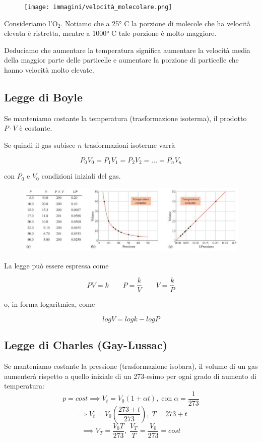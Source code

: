 \hspace{0.5cm}\begin{minipage}{0.55 \textwidth}
    \begin{figure}[H]
        \texttt{[image: immagini/velocità\_molecolare.png]}
    \end{figure}
\end{minipage}
\begin{minipage}{0.4 \textwidth}
\vspace{0.6cm}Consideriamo l'O$_2$. Notiamo che a 25° C la porzione di molecole che ha velocità elevata è ristretta, mentre a 1000° C tale porzione è molto maggiore.

Deduciamo che aumentare la temperatura significa aumentare la velocità media della maggior parte delle particelle e aumentare la porzione di particelle che hanno velocità molto elevate.
\end{minipage}

\subsection{Legge di Boyle}
Se manteniamo costante la temperatura (trasformazione isoterma), il prodotto $P \cdot V$ è costante.

Se quindi il gas subisce $n$ trasformazioni isoterme varrà

$$P_0V_0=P_1V_1=P_2V_2=...=P_nV_n$$

con $P_0$ e $V_0$ condizioni iniziali del gas.

\begin{figure}[htp]
    \centering
    \includegraphics[width=15cm]{immagini/Legge_di_Boyle.png}
\end{figure}

La legge può essere espressa come

$$PV=k \qquad P=\frac{k}{V} \qquad V=\frac{k}{P}$$

o, in forma logaritmica, come

$$logV = logk - log P$$
\newpage
\subsection{Legge di Charles (Gay-Lussac)}
Se manteniamo costante la pressione (trasformazione isobara), il volume di un gas aumenterà rispetto a quello iniziale di un 273-esimo per ogni grado di aumento di temperatura:
$$p=cost \implies V_t=V_0(1 + \alpha t), \; \text{con} \; \alpha=\frac{1}{273}$$
$$\implies V_t=V_0 \left( \frac{273 + t}{273} \right), \; T=273 + t$$
$$\implies V_T = \frac{V_0 T}{273}, \; \frac{V_T}{T}=\frac{V_0}{273}=cost$$

